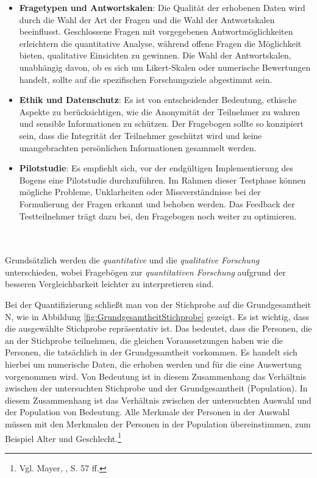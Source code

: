 \begin{itemize}
    \item \textbf{Fragetypen und Antwortskalen}: Die Qualität der erhobenen Daten wird durch die Wahl der Art der Fragen und die Wahl der Antwortskalen beeinflusst.
    Geschlossene Fragen mit vorgegebenen Antwortmöglichkeiten erleichtern die quantitative Analyse, während offene Fragen
    die Möglichkeit bieten, qualitative Einsichten zu gewinnen. Die Wahl der Antwortskalen, unabhängig davon, ob es sich
    um Likert-Skalen oder numerische Bewertungen handelt, sollte auf die spezifischen Forschungsziele abgestimmt sein.

    \item \textbf{Ethik und Datenschutz}: Es ist von entscheidender Bedeutung, ethische Aspekte zu berücksichtigen, wie die Anonymität der Teilnehmer zu wahren
    und sensible Informationen zu schützen. Der Fragebogen sollte so konzipiert sein, dass die Integrität der Teilnehmer
    geschützt wird und keine unangebrachten persönlichen Informationen gesammelt werden.

    \item \textbf{Pilotstudie}: Es empfiehlt sich, vor der endgültigen Implementierung des Bogens eine Pilotstudie durchzuführen. Im Rahmen
    dieser Testphase können mögliche Probleme, Unklarheiten oder Missverständnisse bei der Formulierung der Fragen erkannt
    und behoben werden. Das Feedback der Testteilnehmer trägt dazu bei, den Fragebogen noch weiter zu optimieren.
\end{itemize}
\\
\\

Grundsätzlich werden die \textit{quantitative} und die \textit{qualitative Forschung} unterschieden, wobei Fragebögen zur
\textit{quantitativen Forschung} aufgrund der besseren Vergleichbarkeit leichter zu interpretieren sind.

Bei der Quantifizierung schließt man von der Stichprobe auf die Grundgesamtheit N, wie in Abbildung \ref{fig:GrundgesamtheitStichprobe}
gezeigt. Es ist wichtig, dass die ausgewählte Stichprobe repräsentativ ist. Das bedeutet, dass die Personen, die an der
Stichprobe teilnehmen, die gleichen Voraussetzungen haben wie die Personen, die tatsächlich in der Grundgesamtheit vorkommen.
Es handelt sich hierbei um numerische Daten, die erhoben werden und für die eine Auswertung vorgenommen wird. Von Bedeutung
ist in diesem Zusammenhang das Verhältnis zwischen der untersuchten Stichprobe und der Grundgesamtheit (Population). In
diesem Zusammenhang ist das Verhältnis zwischen der untersuchten Auswahl und der Population von Bedeutung. Alle Merkmale
der Personen in der Auswahl müssen mit den Merkmalen der Personen in der Population übereinstimmen, zum Beispiel Alter
und Geschlecht.\footnote{Vgl. Mayer, \cite{Interview und schriftliche Befragung}, S. 57 ff.}

